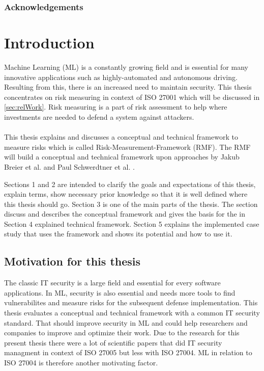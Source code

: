 \begin{abstract}

\end{abstract}

\subsubsection*{Acknowledgements}

\newpage

\section{Introduction}
\label{sec:intro}

Machine Learning (ML) is a constantly growing field and is essential for many innovative applications such as highly-automated and autonomous driving. Resulting from this,
there is an increased need to maintain security. This thesis concentrates on risk measuring in context of ISO 27001 which will be discussed in \ref{sec:relWork}. Risk
measuring is a part of risk assessment to help where investments are needed to defend a system against attackers. \\ \\
This thesis explains and discusses a conceptual and technical framework to measure risks which is called Risk-Measurement-Framework (RMF). The RMF will build a conceptual and technical
framework upon approaches by Jakub Breier et al. \cite{DBLP:journals/corr/abs-2012-04884} and Paul Schwerdtner et al. \cite{DBLP:journals/corr/abs-2011-04328}.

Sections 1 and 2 are intended to clarify the goals and expectations of this thesis, explain terms, show necessary prior knowledge so that it is well defined where this thesis should go. Section 3 is one of the main parts of the thesis. The section discuss and describes the conceptual framework and gives the basis for the in Section 4 explained technical framework. Section 5 explains the implemented case study that uses the framework and shows its potential and how to use it.

\subsection{Motivation for this thesis}

The classic IT security is a large field and essential for every software applications. In ML, security is also essential and needs more tools to find vulnerabilites and measure risks for the subsequent defense implementation. This thesis evaluates a conceptual and technical framework with a common IT security standard. That should improve security in ML and could help researchers and companies to improve and optimize their work. Due to the research for this present thesis there were a lot of scientific papers that did IT security managment in context of ISO 27005 but less with ISO 27004. ML in relation to ISO 27004 is therefore another motivating factor.

